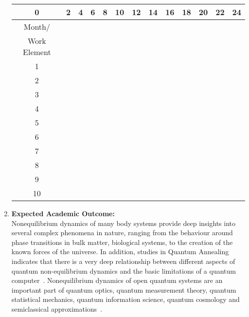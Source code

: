 \documentclass[a4paper,11pt,color]{article}
\begin{document}
\begin{enumerate}[label=(\alph*)]
\begin{tabular}{|c|c|c|c|c|c|c|c|c|c|c|c|c|}
\hline
0 & 2 & 4 & 6 & 8 & 10 & 12 & 14 & 16 & 18 & 20 & 22 & 24 \\
\hline
Month/ & & & & & & & & & & & & \\
Work Element & & & & & & & & & & & &  \\
\hline
1 & \cellcolor[gray]{0} & & & & & & & & & & & \\
\hline
2 & & \cellcolor[gray]{0}& & & & & & & & & &   \\
\hline
3 & & & \cellcolor[gray]{0} &\cellcolor[gray]{0} & & & & & & & & \\
\hline
4 & & & & \cellcolor[gray]{0}& \cellcolor[gray]{0}& & & & & & & \\
\hline
5 & & & & & &\cellcolor[gray]{0} & & & & & & \\
\hline
6 &  &  &  &  &  &\cellcolor[gray]{0}   &\cellcolor[gray]{0}  & \cellcolor[gray]{0} &  &  & &  \\
\hline
7 &  &  &  &  &  &  &  & \cellcolor[gray]{0}& \cellcolor[gray]{0}  &  & &  \\
\hline
8 &  &  &  &  &  &  &  & & &\cellcolor[gray]{0}   &  &  \\
\hline
9 &  &  &  &  &  &  &  & & & \cellcolor[gray]{0} &\cellcolor[gray]{0}  &  \\
\hline
10 &  &  &  &  &  &  &  & & & & \cellcolor[gray]{0}&\cellcolor[gray]{0}   \\
\hline
\end{tabular}
\pagebreak
\item
\textbf{Expected Academic Outcome:}\\
Nonequilibrium dynamics of many body systems provide deep insights into several complex phenomena in nature, ranging from the behaviour around phase transitions in bulk matter, biological systems,  to the creation of the known forces of the universe. In addition, studies in Quantum Annealing indicates that there is a very deep relationship between different aspects of quantum non-equilibrium dynamics and the basic limitations of a quantum computer~\cite{annealing}. Nonequilibrium dynamics of open quantum systems are an important part of quantum optics, quantum measurement theory, quantum statistical mechanics, quantum information science, quantum cosmology and semiclassical approximations~\cite{openq}. 


\end{enumerate}
\end{document}
